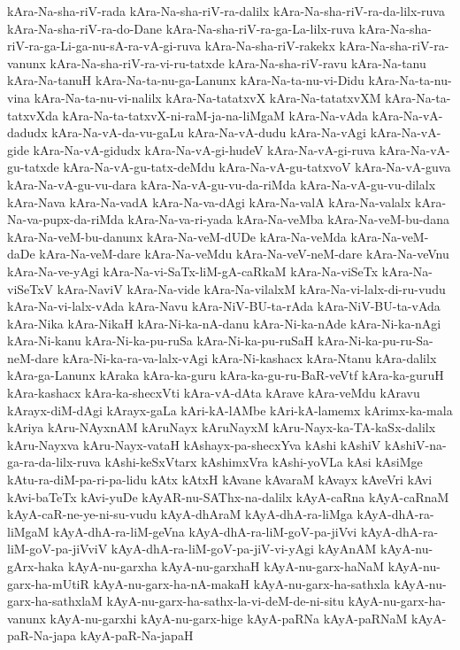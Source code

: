 {kAra-Na-sha-riV-rada
kAra-Na-sha-riV-ra-dalilx
kAra-Na-sha-riV-ra-da-lilx-ruva
kAra-Na-sha-riV-ra-do-Dane
kAra-Na-sha-riV-ra-ga-La-lilx-ruva
kAra-Na-sha-riV-ra-ga-Li-ga-nu-sA-ra-vA-gi-ruva
kAra-Na-sha-riV-rakekx
kAra-Na-sha-riV-ra-vanunx
kAra-Na-sha-riV-ra-vi-ru-tatxde
kAra-Na-sha-riV-ravu
kAra-Na-tanu
kAra-Na-tanuH
kAra-Na-ta-nu-ga-Lanunx
kAra-Na-ta-nu-vi-Didu
kAra-Na-ta-nu-vina
kAra-Na-ta-nu-vi-nalilx
kAra-Na-tatatxvX
kAra-Na-tatatxvXM
kAra-Na-ta-tatxvXda
kAra-Na-ta-tatxvX-ni-raM-ja-na-liMgaM
kAra-Na-vAda
kAra-Na-vA-dadudx
kAra-Na-vA-da-vu-gaLu
kAra-Na-vA-dudu
kAra-Na-vAgi
kAra-Na-vA-gide
kAra-Na-vA-gidudx
kAra-Na-vA-gi-hudeV
kAra-Na-vA-gi-ruva
kAra-Na-vA-gu-tatxde
kAra-Na-vA-gu-tatx-deMdu
kAra-Na-vA-gu-tatxvoV
kAra-Na-vA-guva
kAra-Na-vA-gu-vu-dara
kAra-Na-vA-gu-vu-da-riMda
kAra-Na-vA-gu-vu-dilalx
kAra-Nava
kAra-Na-vadA
kAra-Na-va-dAgi
kAra-Na-valA
kAra-Na-valalx
kAra-Na-va-pupx-da-riMda
kAra-Na-va-ri-yada
kAra-Na-veMba
kAra-Na-veM-bu-dana
kAra-Na-veM-bu-danunx
kAra-Na-veM-dUDe
kAra-Na-veMda
kAra-Na-veM-daDe
kAra-Na-veM-dare
kAra-Na-veMdu
kAra-Na-veV-neM-dare
kAra-Na-veVnu
kAra-Na-ve-yAgi
kAra-Na-vi-SaTx-liM-gA-caRkaM
kAra-Na-viSeTx
kAra-Na-viSeTxV
kAra-NaviV
kAra-Na-vide
kAra-Na-vilalxM
kAra-Na-vi-lalx-di-ru-vudu
kAra-Na-vi-lalx-vAda
kAra-Navu
kAra-NiV-BU-ta-rAda
kAra-NiV-BU-ta-vAda
kAra-Nika
kAra-NikaH
kAra-Ni-ka-nA-danu
kAra-Ni-ka-nAde
kAra-Ni-ka-nAgi
kAra-Ni-kanu
kAra-Ni-ka-pu-ruSa
kAra-Ni-ka-pu-ruSaH
kAra-Ni-ka-pu-ru-Sa-neM-dare
kAra-Ni-ka-ra-va-lalx-vAgi
kAra-Ni-kashacx
kAra-Ntanu
kAra-dalilx
kAra-ga-Lanunx
kAraka
kAra-ka-guru
kAra-ka-gu-ru-BaR-veVtf
kAra-ka-guruH
kAra-kashacx
kAra-ka-shecxVti
kAra-vA-dAta
kArave
kAra-veMdu
kAravu
kArayx-diM-dAgi
kArayx-gaLa
kAri-kA-lAMbe
kAri-kA-lamemx
kArimx-ka-mala
kAriya
kAru-NAyxnAM
kAruNayx
kAruNayxM
kAru-Nayx-ka-TA-kaSx-dalilx
kAru-Nayxva
kAru-Nayx-vataH
kAshayx-pa-shecxYva
kAshi
kAshiV
kAshiV-na-ga-ra-da-lilx-ruva
kAshi-keSxVtarx
kAshimxVra
kAshi-yoVLa
kAsi
kAsiMge
kAtu-ra-diM-pa-ri-pa-lidu
kAtx
kAtxH
kAvane
kAvaraM
kAvayx
kAveVri
kAvi
kAvi-baTeTx
kAvi-yuDe
kAyAR-nu-SAThx-na-dalilx
kAyA-caRna
kAyA-caRnaM
kAyA-caR-ne-ye-ni-su-vudu
kAyA-dhAraM
kAyA-dhA-ra-liMga
kAyA-dhA-ra-liMgaM
kAyA-dhA-ra-liM-geVna
kAyA-dhA-ra-liM-goV-pa-jiVvi
kAyA-dhA-ra-liM-goV-pa-jiVviV
kAyA-dhA-ra-liM-goV-pa-jiV-vi-yAgi
kAyAnAM
kAyA-nu-gArx-haka
kAyA-nu-garxha
kAyA-nu-garxhaH
kAyA-nu-garx-haNaM
kAyA-nu-garx-ha-mUtiR
kAyA-nu-garx-ha-nA-makaH
kAyA-nu-garx-ha-sathxla
kAyA-nu-garx-ha-sathxlaM
kAyA-nu-garx-ha-sathx-la-vi-deM-de-ni-situ
kAyA-nu-garx-ha-vanunx
kAyA-nu-garxhi
kAyA-nu-garx-hige
kAyA-paRNa
kAyA-paRNaM
kAyA-paR-Na-japa
kAyA-paR-Na-japaH
}
